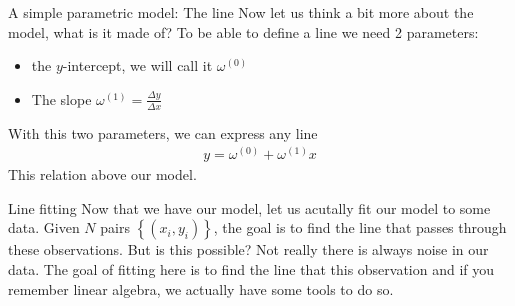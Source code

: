 \begin{parag}{A simple parametric model: The line}
    Now let us think a bit more about the model, what is it made of? To be able to define a line we need 2 parameters:
	\begin{itemize}
		\item the $y$-intercept, we will call it $\omega^{\left(0\right)}$
		\item The slope $\omega^{\left(1\right)} = \frac{\Delta y}{\Delta x}$
	\end{itemize}
	With this two parameters, we can express any line 
	\begin{align*} y = \omega^{\left(0\right)}  + \omega^{\left(1\right)}x\end{align*}
	This relation above  our model.
\end{parag}
\begin{parag}{Line fitting}
    Now that we have our model, let us acutally fit our model to some data. Given $N$ pairs $\left\{\left(x_i, y_i\right)\right\}$, the goal is to find the line that passes through these observations. But is this possible? Not really there is always noise in our data. The goal of fitting here is to find the line that  this observation and if you remember linear algebra, we actually have some tools to do so.
\end{parag}



